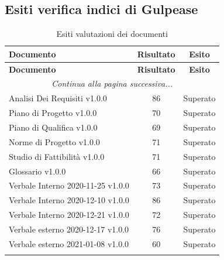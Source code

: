 \documentclass[../piano_di_qualifica.tex]{subfiles}
\begin{document}
\subsection{Esiti verifica indici di Gulpease}
\label{sub:verif_gul}

\begin{center}
	\begin{longtable}{|l|c|c|}
		\hline
		\rowcolor{lightgray}
		\textbf{Documento}                 & \textbf{Risultato} & \textbf{Esito} \\
		\hline
		\endfirsthead
	
		\hline
		\rowcolor{lightgray}
		\textbf{Documento}                 & \textbf{Risultato} & \textbf{Esito} \\
		\hline
		\endhead
		
		\hline
		\multicolumn{3}{|c|}{\emph{Continua alla pagina successiva...}}\\
		\hline
		\endfoot

		\endlastfoot

		Analisi Dei Requisiti v1.0.0       & 86                 & Superato       \\
		Piano di Progetto v1.0.0           & 70                 & Superato       \\
		Piano di Qualifica v1.0.0          & 69                 & Superato       \\
		Norme di Progetto v1.0.0           & 71                 & Superato       \\
		Studio di Fattibilità v1.0.0       & 71                 & Superato       \\
		Glossario v1.0.0                   & 66                 & Superato       \\
		Verbale Interno 2020-11-25 v1.0.0  & 73                 & Superato       \\
		Verbale Interno 2020-12-10 v1.0.0  & 86                 & Superato       \\
		Verbale Interno 2020-12-21 v1.0.0  & 72                 & Superato       \\
		Verbale esterno 2020-12-17  v1.0.0 & 76                 & Superato       \\
		Verbale esterno 2021-01-08  v1.0.0 & 60                 & Superato       \\
		\hline
		\caption{Esiti valutazioni dei documenti}
	\end{longtable}
\end{center}
\end{document}
